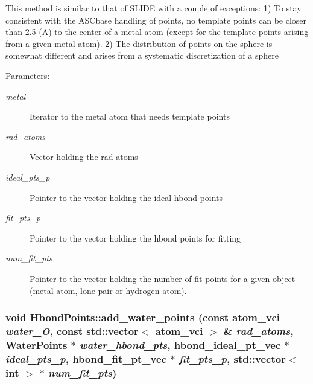 This method is similar to that of SLIDE with a couple of exceptions: 1) To stay consistent with the ASCbase handling of points, no template points can be closer than 2.5 (A) to the center of a metal atom (except for the template points arising from a given metal atom). 2) The distribution of points on the sphere is somewhat different and arises from a systematic discretization of a sphere

\begin{Desc}
\item[Parameters:]
\begin{description}
\item[{\em metal}]Iterator to the metal atom that needs template points \item[{\em rad\_\-atoms}]Vector holding the rad atoms \item[{\em ideal\_\-pts\_\-p}]Pointer to the vector holding the ideal hbond points \item[{\em fit\_\-pts\_\-p}]Pointer to the vector holding the hbond points for fitting \item[{\em num\_\-fit\_\-pts}]Pointer to the vector holding the number of fit points for a given object (metal atom, lone pair or hydrogen atom). \end{description}
\end{Desc}
\subsubsection{\setlength{\rightskip}{0pt plus 5cm}void Hbond\-Points::add\_\-water\_\-points (const atom\_\-vci {\em water\_\-O}, const std::vector$<$ atom\_\-vci $>$ \& {\em rad\_\-atoms}, \bf{Water\-Points} $\ast$ {\em water\_\-hbond\_\-pts}, \bf{hbond\_\-ideal\_\-pt\_\-vec} $\ast$ {\em ideal\_\-pts\_\-p}, \bf{hbond\_\-fit\_\-pt\_\-vec} $\ast$ {\em fit\_\-pts\_\-p}, std::vector$<$ int $>$ $\ast$ {\em num\_\-fit\_\-pts})\hspace{0.3cm}{\tt  [private]}}\label{classASCbase_1_1HbondPoints_94654be41f529fa7a22c08ff9f422e50}


